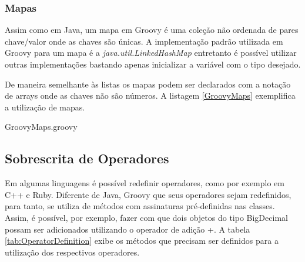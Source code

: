 \documentclass[12pt]{article}
\begin{document}
\subsubsection{Mapas}

    Assim como em Java, um mapa em Groovy é uma coleção não ordenada de pares 
    chave/valor onde as chaves são únicas. A implementação padrão utilizada em 
    Groovy para um mapa é a \emph{java.util.LinkedHashMap} entretanto é possível
    utilizar outras implementações bastando apenas inicializar a variável com o 
    tipo desejado.
    
    De maneira semelhante às listas os mapas podem ser declarados com a notação
    de arrays onde as chaves não são números. A listagem \ref{GroovyMaps} exemplifica
    a utilização de mapas.
    
    
                    {GroovyMaps.groovy}
    
\subsection{Sobrescrita de Operadores}  
    
    Em algumas linguagens é possível redefinir operadores, como por exemplo em 
    C++ e Ruby. Diferente de Java, Groovy que seus operadores sejam redefinidos,
    para tanto, se utiliza de métodos com assinaturas pré-definidas nas classes.
    Assim, é possível, por exemplo, fazer com que dois objetos do tipo BigDecimal
    possam ser adicionados utilizando o operador de adição +. A tabela 
    \ref{tab:OperatorDefinition} exibe os métodos que precisam ser definidos para
    a utilização dos respectivos operadores.
\end{document}
